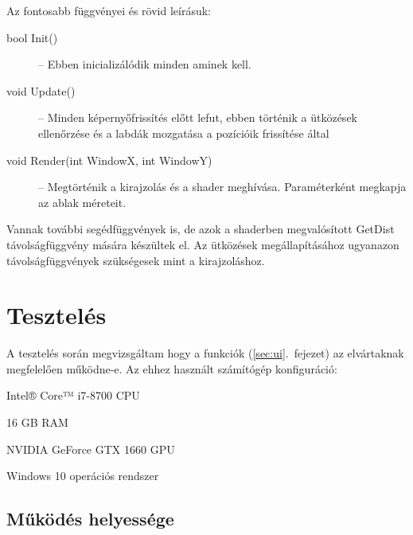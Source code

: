 Az fontosabb függvényei és rövid leírásuk:
\begin{description}
	\item [bool Init()] -- Ebben inicializálódik minden aminek kell.
	\item [void Update()] -- Minden képernyőfrissítés előtt lefut, ebben történik a ütközések ellenőrzése és a labdák mozgatása a pozícióik frissítése által
	\item [void Render(int WindowX, int WindowY)] -- Megtörténik a kirajzolás és a shader meghívása. Paraméterként megkapja az ablak méreteit.
\end{description}

Vannak további segédfüggvények is, de azok a shaderben megvalósított GetDist távolságfüggvény mására készültek el. Az ütközések megállapításához ugyanazon távolságfüggvények szükségesek mint a kirajzoláshoz.

\section{Tesztelés}

A tesztelés során megvizsgáltam hogy a funkciók (\ref{sec:ui}.~fejezet) az elvártaknak megfelelően működne-e. Az ehhez használt számítógép konfiguráció:
\begin{compactitem}
	\item Intel® Core™ i7-8700 CPU
	\item 16 GB RAM
	\item NVIDIA GeForce GTX 1660 GPU
	\item Windows 10 operációs rendszer
\end{compactitem}

\subsection{Működés helyessége}


